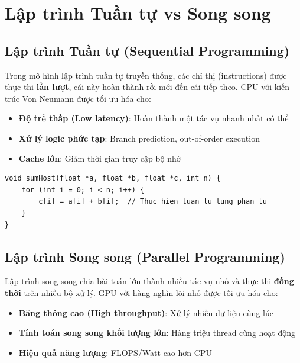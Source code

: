 \section{Lập trình Tuần tự vs Song song}

\subsection{Lập trình Tuần tự (Sequential Programming)}

Trong mô hình lập trình tuần tự truyền thống, các chỉ thị (instructions) được thực thi \textbf{lần lượt}, cái này hoàn thành rồi mới đến cái tiếp theo. CPU với kiến trúc Von Neumann được tối ưu hóa cho:
\begin{itemize}
    \item \textbf{Độ trễ thấp (Low latency)}: Hoàn thành một tác vụ nhanh nhất có thể
    \item \textbf{Xử lý logic phức tạp}: Branch prediction, out-of-order execution
    \item \textbf{Cache lớn}: Giảm thời gian truy cập bộ nhớ
\end{itemize}

\begin{lstlisting}[caption={Ví dụ: Cộng hai vector tuần tự trên CPU}, label={lst:seq_sum}]
void sumHost(float *a, float *b, float *c, int n) {
    for (int i = 0; i < n; i++) {
        c[i] = a[i] + b[i];  // Thuc hien tuan tu tung phan tu
    }
}
\end{lstlisting}

\subsection{Lập trình Song song (Parallel Programming)}

Lập trình song song chia bài toán lớn thành nhiều tác vụ nhỏ và thực thi \textbf{đồng thời} trên nhiều bộ xử lý. GPU với hàng nghìn lõi nhỏ được tối ưu hóa cho:
\begin{itemize}
    \item \textbf{Băng thông cao (High throughput)}: Xử lý nhiều dữ liệu cùng lúc
    \item \textbf{Tính toán song song khối lượng lớn}: Hàng triệu thread cùng hoạt động
    \item \textbf{Hiệu quả năng lượng}: FLOPS/Watt cao hơn CPU
\end{itemize}

